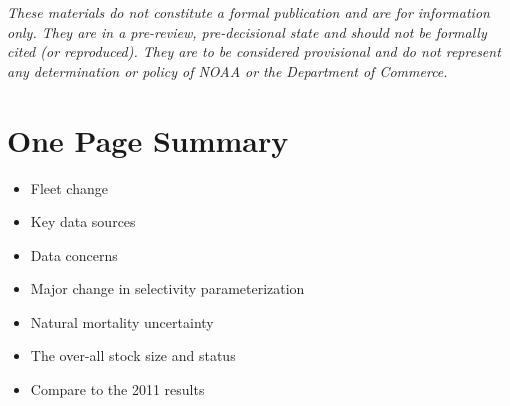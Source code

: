 \documentclass[11pt,
  english,
  a4paper,
]{article}
\begin{document}
\newcommand{\lt}{\ensuremath <}
\newcommand{\gt}{\ensuremath >}

\newlength{\cslhangindent}
\setlength{\cslhangindent}{1.5em}
\newenvironment{cslreferences}%
  {\setlength{\parindent}{0pt}%
  \everypar{\setlength{\hangindent}{\cslhangindent}}\ignorespaces}%
  {\par}

\vspace{20cm}


\emph{These materials do not constitute a formal publication and are for information only. They are in a pre-review, pre-decisional state and should not be formally cited (or reproduced). They are to be considered provisional and do not represent any determination or policy of NOAA or the Department of Commerce.}

\leavevmode\tagmcend\tagstructend\par

\pagebreak
{}
\setcounter{page}{1}

\renewcommand{\thetable}{\roman{table}}
\renewcommand{\thefigure}{\roman{figure}}

\setlength\parskip{0.5em plus 0.1em minus 0.2em}


\hypertarget{one-page-summary}{%
\section*{One Page Summary}\label{one-page-summary}}

\leavevmode\tagmcend\tagstructend

\begin{itemize}

\item Fleet change

\item Key data sources

\item Data concerns

\item Major change in selectivity parameterization

\item Natural mortality uncertainty

\item The over-all stock size and status

\item Compare to the 2011 results

\end{itemize}
\end{document}
